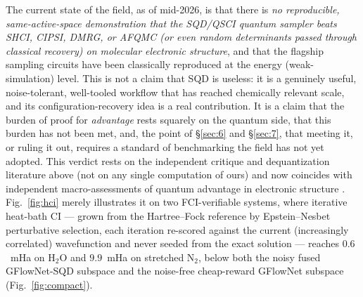 \documentclass[11pt]{article}
\begin{document}
The current state of the field, as of mid-2026, is that there is \emph{no reproducible, same-active-space demonstration that the SQD/QSCI quantum sampler beats SHCI, CIPSI, DMRG, or AFQMC (or even random determinants passed through classical recovery) on molecular electronic structure}, and that the flagship sampling circuits have been classically reproduced at the energy (weak-simulation) level. This is not a claim that SQD is useless: it is a genuinely useful, noise-tolerant, well-tooled workflow that has reached chemically relevant scale, and its configuration-recovery idea is a real contribution. It is a claim that the burden of proof for \emph{advantage} rests squarely on the quantum side, that this burden has not been met, and, the point of \S\ref{sec:6} and \S\ref{sec:7}, that meeting it, or ruling it out, requires a standard of benchmarking the field has not yet adopted. This verdict rests on the independent critique and dequantization literature above (not on any single computation of ours) and now coincides with independent macro-assessments of quantum advantage in electronic structure \cite{lee2023,gundlach2025,legeza2026}. Fig.~\ref{fig:hci} merely illustrates it on two FCI-verifiable systems, where iterative heat-bath CI --- grown from the Hartree--Fock reference by Epstein--Nesbet perturbative selection, each iteration re-scored against the current (increasingly correlated) wavefunction and never seeded from the exact solution --- reaches $0.6$~mHa on H$_2$O and $9.9$~mHa on stretched N$_2$, below both the noisy fused GFlowNet-SQD subspace and the noise-free cheap-reward GFlowNet subspace (Fig.~\ref{fig:compact}).
\end{document}
